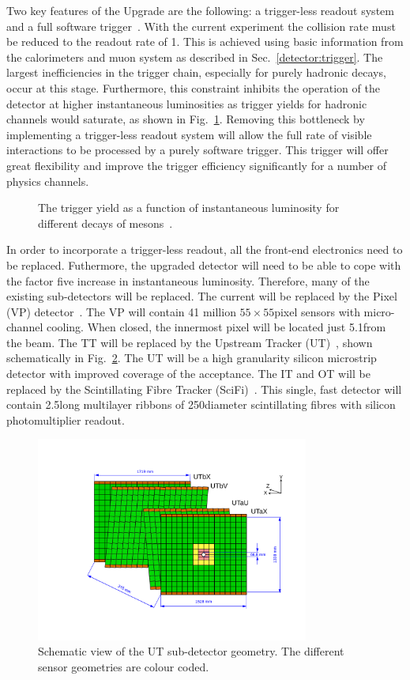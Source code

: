 Two key features of the \lhcb Upgrade are the following: a trigger-less readout system and a full software trigger~\cite{LHCb-TDR-016}. With the current experiment the collision rate must be reduced to the readout rate of 1\mhz. This is achieved using basic information from the calorimeters and muon system as described in Sec.~\ref{detector:trigger}. The largest inefficiencies in the trigger chain, especially for purely hadronic decays, occur at this stage. Furthermore, this constraint inhibits the operation of the detector at higher instantaneous luminosities as trigger yields for hadronic channels would saturate, as shown in Fig.~\ref{fig:upgrade-motivation}. Removing this bottleneck by implementing a trigger-less readout system will allow the full rate of visible interactions to be processed by a purely software trigger. This trigger will offer great flexibility and improve the trigger efficiency significantly for a number of physics channels. %

\begin{figure}[!tb]
\centering
{}
\caption{The trigger yield as a function of instantaneous luminosity for different decays of \B mesons~\cite{upgrade-loi}.}
\label{fig:upgrade-motivation}
\end{figure}

In order to incorporate a trigger-less readout, all the front-end electronics need to be replaced. Futhermore, the upgraded detector will need to be able to cope with the factor five increase in instantaneous luminosity. Therefore, many of the existing sub-detectors will be replaced. The current \velo will be replaced by the \velo Pixel (VP) detector~\cite{LHCb-TDR-013}. The VP will contain 41 million $55\times55$\mum pixel sensors with micro-channel \cotwo cooling. When closed, the innermost pixel will be located just 5.1\mm from the \lhc beam. The TT will be replaced by the Upstream Tracker (UT)~\cite{LHCb-TDR-015}, shown schematically in Fig.~\ref{fig:ut}. The UT will be a high granularity silicon microstrip detector with improved coverage of the \lhcb acceptance. The IT and OT will be replaced by the Scintillating Fibre Tracker (SciFi)~\cite{LHCb-TDR-015}. This single, fast detector will contain 2.5\m long multilayer ribbons of 250\mum diameter scintillating fibres with silicon photomultiplier readout.

\begin{figure}[!tb]
\centering
\includegraphics[width=0.8\textwidth]{figs/detector/ut.pdf}
\caption{Schematic view of the UT sub-detector geometry. The different sensor geometries are colour coded.}
\label{fig:ut}
\end{figure}
